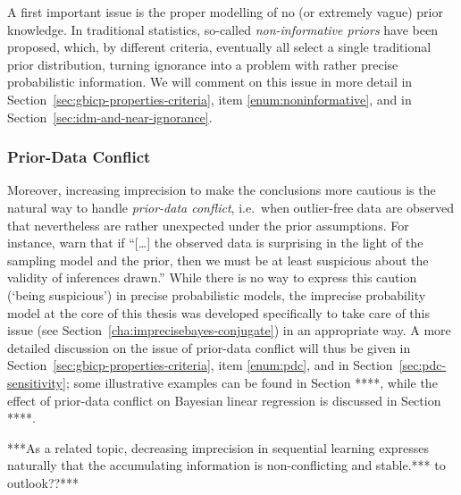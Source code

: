 A first important issue is the proper modelling of no (or extremely vague) prior knowledge.
In traditional statistics, so-called \emph{non-informative priors} have been proposed, which, by different criteria,
eventually all select a single traditional prior distribution,
turning ignorance into a problem with rather precise probabilistic information.
We will comment on this issue in more detail in Section~\ref{sec:gbicp-properties-criteria},
item \ref{enum:noninformative}, and in Section~\ref{sec:idm-and-near-ignorance}.

\subsubsection{Prior-Data Conflict}
\label{sec:motivation:pdc}

Moreover, increasing imprecision to make the conclusions more cautious
is the natural way to handle \emph{prior-data conflict},
i.e.\ when outlier-free data are observed that nevertheless are rather unexpected under the prior assumptions.
For instance, \textcite[p.~893]{2006:evans} warn that if
``[\ldots] the observed data is surprising in the light of the sampling model and the prior,
then we must be at least suspicious about the validity of inferences drawn.''
While there is no way to express this caution (`being suspicious') in precise probabilistic models,
the imprecise probability model at the core of this thesis was developed specifically to take care of this issue
(see Section~\ref{cha:imprecisebayes-conjugate}) in an appropriate way.
A more detailed discussion on the issue of prior-data conflict will thus be given in Section~\ref{sec:gbicp-properties-criteria},
item \ref{enum:pdc}, and in Section~\ref{sec:pdc-sensitivity};
some illustrative examples can be found in Section ****,
while the effect of prior-data conflict on Bayesian linear regression is discussed in Section ****.

***As a related topic, decreasing imprecision in sequential learning
expresses naturally that the accumulating information is non-conflicting and stable.*** to outlook??***





